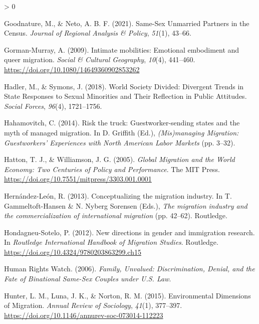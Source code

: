 \documentclass[
  12pt,
]{article}
\newlength{\cslhangindent}
\newenvironment{CSLReferences}[2] %
 {%
  \setlength{\parindent}{0pt}
  \ifodd #1 \everypar{\setlength{\hangindent}{\cslhangindent}}\ignorespaces\fi
  \ifnum #2 > 0
  \setlength{\parskip}{#2\baselineskip}
  \fi
 }%
 {}
\begin{document}
\begin{CSLReferences}{1}{0}
\leavevmode\hypertarget{ref-goodnature_2021}{}%
Goodnature, M., \& Neto, A. B. F. (2021). Same-{Sex Unmarried Partners} in the {Census}. \emph{Journal of Regional Analysis \& Policy}, \emph{51}(1), 43--66.

\leavevmode\hypertarget{ref-gorman-murray_2009}{}%
Gorman-Murray, A. (2009). Intimate mobilities: Emotional embodiment and queer migration. \emph{Social \& Cultural Geography}, \emph{10}(4), 441--460. \url{https://doi.org/10.1080/14649360902853262}

\leavevmode\hypertarget{ref-hadler_2018_world}{}%
Hadler, M., \& Symons, J. (2018). World {Society Divided}: Divergent {Trends} in {State Responses} to {Sexual Minorities} and {Their Reflection} in {Public Attitudes}. \emph{Social Forces}, \emph{96}(4), 1721--1756.

\leavevmode\hypertarget{ref-hahamovitch_2014}{}%
Hahamovitch, C. (2014). Risk the truck: Guestworker-sending states and the myth of managed migration. In D. Griffith (Ed.), \emph{({Mis})managing {Migration}: Guestworkers' {Experiences} with {North American Labor Markets}} (pp. 3--32).

\leavevmode\hypertarget{ref-hatton_2005a}{}%
Hatton, T. J., \& Williamson, J. G. (2005). \emph{Global {Migration} and the {World Economy}: Two {Centuries} of {Policy} and {Performance}}. {The MIT Press}. \url{https://doi.org/10.7551/mitpress/3303.001.0001}

\leavevmode\hypertarget{ref-hernandez-leon_2013}{}%
Hernández-León, R. (2013). Conceptualizing the migration industry. In T. Gammeltoft-Hansen \& N. Nyberg Sorensen (Eds.), \emph{The migration industry and the commercialization of international migration} (pp. 42--62). {Routledge}.

\leavevmode\hypertarget{ref-hondagneu-sotelo_2012}{}%
Hondagneu-Sotelo, P. (2012). New directions in gender and immigration research. In \emph{Routledge {International Handbook} of {Migration Studies}}. {Routledge}. \url{https://doi.org/10.4324/9780203863299.ch15}

\leavevmode\hypertarget{ref-humanrightswatch_2006}{}%
Human Rights Watch. (2006). \emph{Family, {Unvalued}: Discrimination, {Denial}, and the {Fate} of {Binational Same}-{Sex Couples} under {U}.{S}. {Law}}.

\leavevmode\hypertarget{ref-hunter_2015}{}%
Hunter, L. M., Luna, J. K., \& Norton, R. M. (2015). Environmental {Dimensions} of {Migration}. \emph{Annual Review of Sociology}, \emph{41}(1), 377--397. \url{https://doi.org/10.1146/annurev-soc-073014-112223}


\end{CSLReferences}
\end{document}
